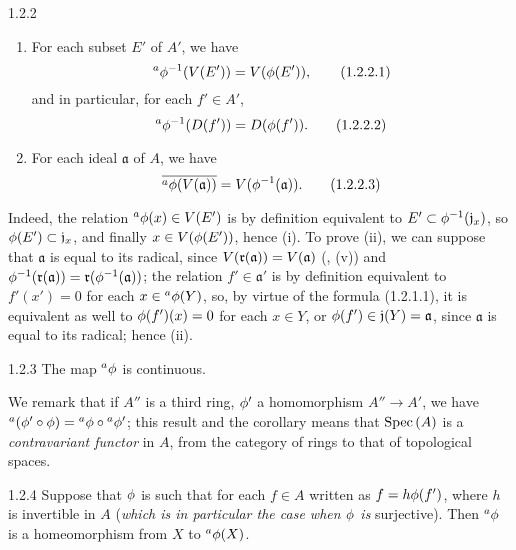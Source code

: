 \begin{envs}[Proposition]{1.2.2}
\label{prop-1.1.2.2}
\begin{enumerate}[label=\rm{(\roman*)}]
  \item For each subset $E'$ of $A'$, we have
        \[
          {}^a\phi^{-1}(V(E'))=V(\phi(E')),
          \tag{1.2.2.1}
        \]
        and in particular, for each $f'\in A'$,
        \[
          {}^a\phi^{-1}(D(f'))=D(\phi(f')).
          \tag{1.2.2.2}
        \]
  \item For each ideal $\mathfrak{a}$ of $A$, we have
        \[
          \overline{{}^a\phi(V(\mathfrak{a}))}=V(\phi^{-1}(\mathfrak{a})).
          \tag{1.2.2.3}
        \]
\end{enumerate}
\end{envs}

Indeed, the relation ${}^a\phi(x)\in V(E')$ is by definition equivalent to
$E'\subset\phi^{-1}(\mathfrak{j}_x)$, so $\phi(E')\subset\mathfrak{j}_x$, and
finally $x\in V(\phi(E'))$, hence (i). To prove (ii), we can suppose that
$\mathfrak{a}$ is equal to its radical, since $V(\mathfrak{r}(\mathfrak{a}))=V(\mathfrak{a})$
(, (v)) and
$\phi^{-1}(\mathfrak{r}(\mathfrak{a}))=\mathfrak{r}(\phi^{-1}(\mathfrak{a}))$; the relation
$f'\in\mathfrak{a}'$ is by definition equivalent to $f'(x')=0$ for each
$x\in{{}^a\phi(Y)}$, so, by virtue of the formula (1.2.1.1), it is equivalent as well
to $\phi(f')(x)=0$ for each $x\in Y$, or $\phi(f')\in\mathfrak{j}(Y)=\mathfrak{a}$,
since $\mathfrak{a}$ is equal to its radical; hence (ii).

\begin{envs}[Corollary]{1.2.3}
\label{cor-1.1.2.3}
The map ${}^a\phi$ is continuous.
\end{envs}

We remark that if $A''$ is a third ring, $\phi'$ a homomorphism $A''\to A'$, we have
${}^a(\phi'\circ\phi)={}^a\phi\circ{}^a\phi'$; this result and the corollary
 means that ${\mathop{\mathrm{Spec}}\nolimits}\,(A)$ is a \emph{contravariant functor} in $A$, from the
category of rings to that of topological spaces.

\begin{envs}[Corollary]{1.2.4}
\label{cor-1.1.2.4}
Suppose that $\phi$ is such that for each $f\in A$ written as $f=h\phi(f')$, where $h$ is
invertible in $A$ (\emph{which is in particular the case when $\phi$ is} surjective). Then
${}^a\phi$ is a homeomorphism from $X$ to ${}^a\phi(X)$.
\end{envs}

